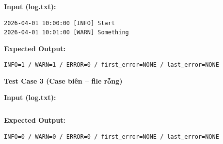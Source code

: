 \textbf{Input (log.txt):}
\begin{lstlisting}
2026-04-01 10:00:00 [INFO] Start
2026-04-01 10:01:00 [WARN] Something
\end{lstlisting}

\textbf{Expected Output:}
\begin{lstlisting}
INFO=1 / WARN=1 / ERROR=0 / first_error=NONE / last_error=NONE
\end{lstlisting}

\vspace{0.5cm}

\textbf{Test Case 3 (Case biên -- file rỗng)}

\textbf{Input (log.txt):}
\begin{lstlisting}
\end{lstlisting}

\textbf{Expected Output:}
\begin{lstlisting}
INFO=0 / WARN=0 / ERROR=0 / first_error=NONE / last_error=NONE
\end{lstlisting}